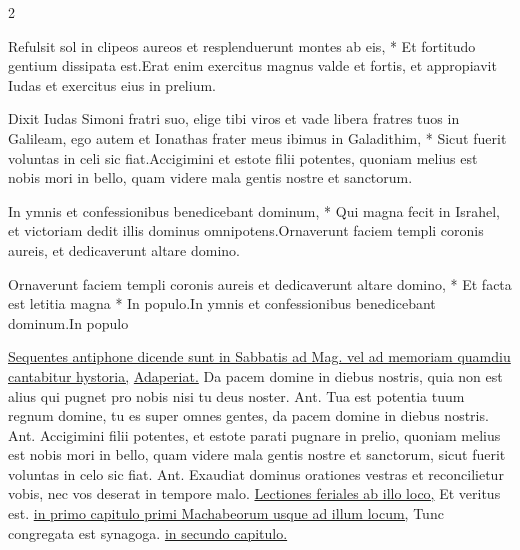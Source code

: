 \begin{multicols*}{2}
\begin{responsory-doxology}
{Refulsit sol in clipeos aureos et resplenduerunt montes ab eis, * Et fortitudo gentium dissipata est.}{Erat enim exercitus magnus valde et fortis, et appropiavit Iudas et exercitus eius in prelium.}
\end{responsory-doxology}%
\begin{responsory}
{Dixit Iudas Simoni fratri suo, elige tibi viros et vade libera fratres tuos in Galileam, ego autem et Ionathas frater meus ibimus in Galadithim, * Sicut fuerit voluntas in celi sic fiat.}{Accigimini et estote filii potentes, quoniam melius est nobis mori in bello, quam videre mala gentis nostre et sanctorum.}
\end{responsory}%
\begin{responsory}[in-ymnis-et]
{In ymnis et confessionibus benedicebant dominum, * Qui magna fecit in Israhel, et victoriam dedit illis dominus omnipotens.}{Ornaverunt faciem templi coronis aureis, et dedicaverunt altare domino.}
\end{responsory}%
\begin{responsory-final}
{Ornaverunt faciem templi coronis aureis et dedicaverunt altare domino, * Et facta est letitia magna * In populo.}{In ymnis et confessionibus benedicebant dominum.}{In populo}
\end{responsory-final}%
\newline \ul{Sequentes antiphone dicende sunt in Sabbatis ad Mag. vel ad memoriam quamdiu cantabitur hystoria,} \hyperlink{adaperiat-dominus}{Adaperiat.}
 Da pacem domine in diebus nostris, quia non est alius qui pugnet pro nobis nisi tu deus noster. {\color{Red} Ant.} Tua est potentia tuum regnum domine, tu es super omnes gentes, da pacem domine in diebus nostris. {\color{Red} Ant.} Accigimini filii potentes, et estote parati pugnare in prelio, quoniam melius est nobis mori in bello, quam videre mala gentis nostre et sanctorum, sicut fuerit voluntas in celo sic fiat. {\color{Red} Ant.} Exaudiat dominus orationes vestras et reconcilietur vobis, nec vos deserat in tempore malo.
\newline \ul{Lectiones feriales ab illo loco,} Et veritus est. \ul{in primo capitulo primi Machabeorum usque ad illum locum,} Tunc congregata est synagoga. \ul{in secundo capitulo.}
{\color{Red} }

\end{multicols*}
